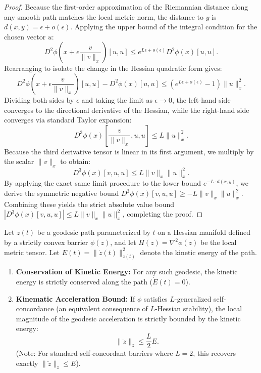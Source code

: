 \begin{proof}
Because the first-order approximation of the Riemannian distance along any smooth path matches the local metric norm, the distance to $y$ is $d(x, y) = \epsilon + o(\epsilon)$. Applying the upper bound of the integral condition for the chosen vector $u$:
\begin{equation}
    D^2\phi\left(x + \epsilon \frac{v}{\|v\|_x}\right)[u,u] \le e^{L\epsilon + o(\epsilon)} D^2\phi(x)[u,u].
\end{equation}
Rearranging to isolate the change in the Hessian quadratic form gives:
\begin{equation}
    D^2\phi\left(x + \epsilon \frac{v}{\|v\|_x}\right)[u,u] - D^2\phi(x)[u,u] \le \left(e^{L\epsilon + o(\epsilon)} - 1\right) \|u\|_x^2.
\end{equation}
Dividing both sides by $\epsilon$ and taking the limit as $\epsilon \to 0$, the left-hand side converges to the directional derivative of the Hessian, while the right-hand side converges via standard Taylor expansion:
\begin{equation}
    D^3\phi(x)\left[ \frac{v}{\|v\|_x}, u, u \right] \le L \|u\|_x^2.
\end{equation}
Because the third derivative tensor is linear in its first argument, we multiply by the scalar $\|v\|_x$ to obtain:
\begin{equation}
    D^3\phi(x)[v, u, u] \le L \|v\|_x \|u\|_x^2.
\end{equation}
By applying the exact same limit procedure to the lower bound $e^{-L \cdot d(x,y)}$, we derive the symmetric negative bound $D^3\phi(x)[v, u, u] \ge -L \|v\|_x \|u\|_x^2$. Combining these yields the strict absolute value bound $|D^3\phi(x)[v, u, u]| \le L \|v\|_x \|u\|_x^2$, completing the proof.
\end{proof}


\begin{lemma}
\label{lem:kinematic_energy}
Let $z(t)$ be a geodesic path parameterized by $t$ on a Hessian manifold defined by a strictly convex barrier $\phi(z)$, and let $H(z) = \nabla^2 \phi(z)$ be the local metric tensor. Let $E(t) = \|\dot{z}(t)\|_{z(t)}^2$ denote the kinetic energy of the path.
\begin{enumerate}
    \item \textbf{Conservation of Kinetic Energy:} For any such geodesic, the kinetic energy is strictly conserved along the path ($\dot{E}(t) = 0$).
    \item \textbf{Kinematic Acceleration Bound:} If $\phi$ satisfies $L$-generalized self-concordance (an equivalent consequence of $L$-Hessian stability), the local magnitude of the geodesic acceleration is strictly bounded by the kinetic energy:
    \begin{equation}
        \|\ddot{z}\|_z \le \frac{L}{2} E.
    \end{equation}
    (Note: For standard self-concordant barriers where $L=2$, this recovers exactly $\|\ddot{z}\|_z \le E$).
\end{enumerate}
\end{lemma}

